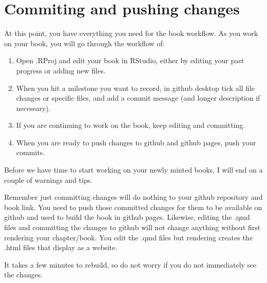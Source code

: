 \documentclass[
  letterpaper,
  DIV=11,
  numbers=noendperiod]{scrreprt}
\begin{document}
\section{Commiting and pushing
changes}\label{commiting-and-pushing-changes}

At this point, you have everything you need for the book workflow. As
you work on your book, you will go through the workflow of:

\begin{enumerate}
\def\labelenumi{\arabic{enumi}.}
\item
  Open .RProj and edit your book in RStudio, either by editing your past
  progress or adding new files.
\item
  When you hit a milestone you want to record, in github desktop tick
  all file changes or specific files, and add a commit message (and
  longer description if necessary).
\item
  If you are continuing to work on the book, keep editing and
  committing.
\item
  When you are ready to push changes to github and github pages, push
  your commits.
\end{enumerate}

Before we have time to start working on your newly minted books, I will
end on a couple of warnings and tips.

\begin{tcolorbox}[enhanced jigsaw, colbacktitle=quarto-callout-caution-color!10!white, titlerule=0mm, leftrule=.75mm, title=\textcolor{quarto-callout-caution-color}{\faFire}\hspace{0.5em}{Caution}, breakable, bottomrule=.15mm, opacitybacktitle=0.6, rightrule=.15mm, opacityback=0, arc=.35mm, colframe=quarto-callout-caution-color-frame, toptitle=1mm, bottomtitle=1mm, toprule=.15mm, left=2mm, colback=white, coltitle=black]

Remember just committing changes will do nothing to your github
repository and book link. You need to push those committed changes for
them to be available on github and used to build the book in github
pages. Likewise, editing the .qmd files and committing the changes to
github will not change anything without first rendering your
chapter/book. You edit the .qmd files but rendering creates the .html
files that display as a website.

It takes a few minutes to rebuild, so do not worry if you do not
immediately see the changes.

\end{tcolorbox}
\end{document}
